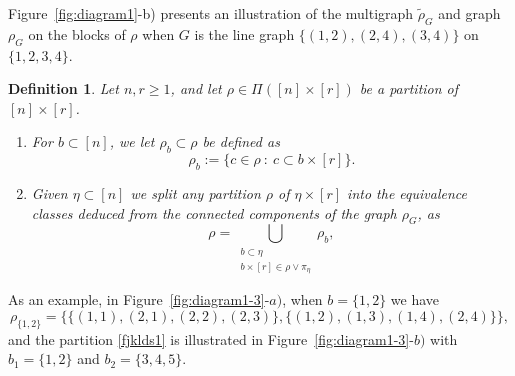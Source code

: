 \documentclass[12pt]{article}
\newtheorem{definition}[prop]{Definition}
\numberwithin{equation}{section}
\begin{document}
\noindent
 Figure~\ref{fig:diagram1}-b) presents an illustration of the
multigraph $\widetilde{\rho}_G$ and graph $\rho_G$ on the blocks of $\rho$ when
$G$ is the line graph
$\{(1,2),(2,4),(3,4)\}$ on $\{1,2,3,4\}$. %

\begin{definition}
  Let $n , r \geq 1$,
  and let $\rho \in \Pi ([n]\times [r])$ be a partition of $[n]\times [r]$.
  \begin{enumerate}[\rm 1.] 
  \item
    For $b \subset [n]$, we let $\rho_b \subset \rho$ be defined as 
$$
\rho_b := \{ c \in \rho \ : \ c \subset b\times[r] \}. 
$$
\item Given $\eta \subset [n]$ 
 we split any partition $\rho$ of $\eta\times[r]$ into the equivalence classes
 deduced from the connected components of the graph $\rho_G$, as 
\begin{equation}
\label{fjklds1} 
\rho = \bigcup_{\substack{b\subset\eta\\b\times [r] \in \rho \vee \pi_\eta}} \rho_b, 
\end{equation} 
\end{enumerate}
\end{definition} 
 As an example, in Figure~\ref{fig:diagram1-3}-$a)$, when $b = \{1,2\}$ we have
$$
\rho_{\{1,2\}} = \big\{\{(1,1),(2,1),(2,2),(2,3)\},
\{(1,2),(1,3),(1,4),(2,4)\}\big\}, 
$$
and the partition \eqref{fjklds1} is
illustrated in Figure~\ref{fig:diagram1-3}-$b)$ with
 $b_1 = \{ 1,2\}$ and $b_2 = \{3,4,5\}$. 

\end{document}
